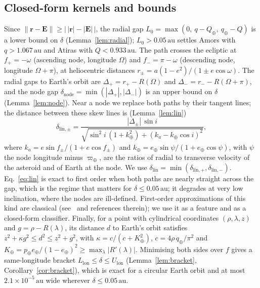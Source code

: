 \documentclass[make,article,submit,moreauthors]{Definitions/mdpi}
\newcommand{\au}{\,\mathrm{au}}
\begin{document}
\subsection{Closed-form kernels and bounds}
\label{sec:closed}
Since $\lVert\mathbf{r}-\mathbf{E}\rVert \ge \bigl|\,|\mathbf{r}|-|\mathbf{E}|\,\bigr|$, the radial gap $L_0 = \max(0,\ q - Q_\oplus,\ q_\oplus - Q)$ is a lower bound on $\delta$ (Lemma~\ref{lem:radial}); $L_0 > 0.05\au$ settles Amors with $q > 1.067\au$ and Atiras with $Q < 0.933\au$. The path crosses the ecliptic at $f_+ = -\omega$ (ascending node, longitude $\Omega$) and $f_- = \pi - \omega$ (descending node, longitude $\Omega + \pi$), at heliocentric distances $r_\pm = a(1-e^2)/(1 \pm e\cos\omega)$. The radial gaps to Earth's orbit are $\Delta_+ = r_+ - R(\Omega)$ and $\Delta_- = r_- - R(\Omega + \pi)$, and the node gap $\delta_{\mathrm{node}} = \min(|\Delta_+|, |\Delta_-|)$ is an upper bound on $\delta$ (Lemma~\ref{lem:node}). Near a node we replace both paths by their tangent lines; the distance between these skew lines is (Lemma~\ref{lem:lin})
\begin{equation}
\delta_{\mathrm{lin},\pm} = \frac{|\Delta_\pm|\,\sin i}{\sqrt{\sin^2 i\,(1 + k_\oplus^2) + (k_a - k_\oplus\cos i)^2}},
\label{eq:lin}
\end{equation}
where $k_a = e\sin f_\pm / (1 + e\cos f_\pm)$ and $k_\oplus = e_\oplus\sin\psi/(1 + e_\oplus\cos\psi)$, with $\psi$ the node longitude minus $\varpi_\oplus$, are the ratios of radial to transverse velocity of the asteroid and of Earth at the node. We use $\delta_{\mathrm{lin}} = \min(\delta_{\mathrm{lin},+}, \delta_{\mathrm{lin},-})$. Eq.~\eqref{eq:lin} is exact to first order when both paths are nearly straight across the gap, which is the regime that matters for $\delta \le 0.05\au$; it degrades at very low inclination, where the nodes are ill-defined. First-order approximations of this kind are classical (see~\cite{hedo2018,hedo2020} and references therein); we use it as a feature and as a closed-form classifier. Finally, for a point with cylindrical coordinates $(\rho, \lambda, z)$ and $g = \rho - R(\lambda)$, its distance $d$ to Earth's orbit satisfies $z^2 + \kappa g^2 \le d^2 \le z^2 + g^2$, with $\kappa = c/(c + K_\oplus^2)$, $c = 4\rho\,q_\oplus/\pi^2$ and $K_\oplus = p_\oplus e_\oplus/(1 - e_\oplus)^2 \ge \max_\lambda |R'(\lambda)|$. Minimising both sides over $f$ gives a same-longitude bracket $L_{\mathrm{lon}} \le \delta \le U_{\mathrm{lon}}$ (Lemma~\ref{lem:bracket}, Corollary~\ref{cor:bracket}), which is exact for a circular Earth orbit and at most $2.1\times10^{-5}\au$ wide wherever $\delta \le 0.05\au$.
\end{document}
